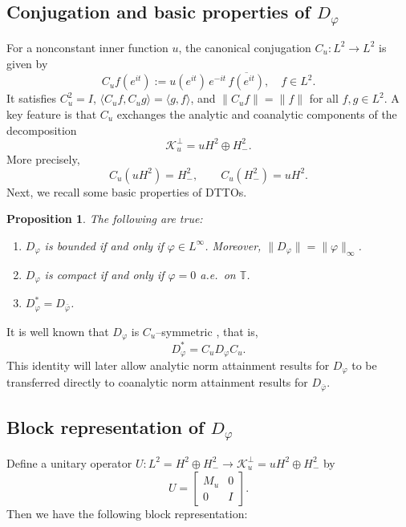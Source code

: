 \documentclass[12pt]{amsart}
\newtheorem{proposition}[theorem]{Proposition}
\theoremstyle{definition}
\theoremstyle{remark}
\def \T{\mathbb{T}}
\newcommand{\clk}{\mathcal{K}}
\newcommand{\vp}{\varphi}
\numberwithin{equation}{section}
\begin{document}
\subsection{Conjugation and basic properties of $D_\vp$}

For a nonconstant inner function $u$, the canonical conjugation $C_u : L^2 \longrightarrow L^2$ is given by
\[C_u f(e^{it}) := u(e^{it})\,e^{-it}\,\overline{f(e^{it})},\quad f\in L^2.\]
It satisfies $C_u^2 = I$, $\langle C_u f, C_u g \rangle = \langle g, f \rangle$, and $\|C_u f\| = \|f\|$ for all $f,g\in L^2$. A key feature is that $C_u$ exchanges the analytic and coanalytic components of the decomposition
\[\clk_u^\perp = uH^2 \oplus H^2_{-}.\]
More precisely,
\begin{equation}\label{eq:Cu-swap-cor}
C_u(uH^2) = H^2_{-}, \qquad C_u(H^2_{-}) = uH^2.
\end{equation}
Next, we recall some basic properties of DTTOs.

\begin{proposition}\cite{Sang:Ding}
The following are true:
\begin{enumerate}
\item $D_\vp$ is bounded if and only if $\vp\in L^\infty$. Moreover, $\|D_\vp\|=\|\vp\|_\infty$.
\item $D_\vp$ is compact if and only if $\vp=0$ a.e.\ on $\T$.
\item $D^*_\vp = D_{\bar{\vp}}$.
\end{enumerate}
\end{proposition}
It is well known that $D_\vp$ is $C_u$--symmetric \cite[Theorem 2.7]{Gu}, that is,
\begin{equation}\label{eq:Cu-symm-cor}
D_\vp^* = C_u D_\vp C_u.
\end{equation}
This identity will later allow analytic norm attainment results for $D_{\vp}$ to be transferred directly to coanalytic norm attainment results for $D_{\bar{\vp}}$.
\subsection{Block representation of $D_\vp$}

Define a unitary operator $U:L^2 = H^2\oplus H^2_{-}\to \clk_u^\perp = uH^2\oplus H^2_{-}$ by
\begin{equation}\label{unitary:equiv}
U =
\begin{bmatrix}
M_u & 0\\
0   & I
\end{bmatrix}.
\end{equation}
Then we have the following block representation:
\end{document}
